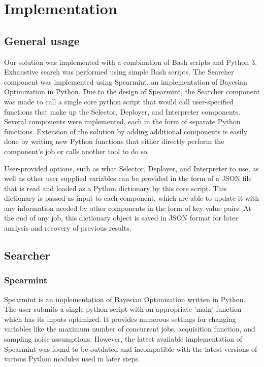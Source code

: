 \documentclass{report}
\begin{document}
\chapter{Implementation}
\section{General usage}
Our solution was implemented with a combination of Bash scripts and Python 3. Exhaustive search was performed using simple Bash scripts. The Searcher component was implemented using Spearmint\cite{Snoek2012}, an implementation of Bayesian Optimization in Python. Due to the design of Spearmint, the Searcher component was made to call a single core python script that would call user-specified functions that make up the Selector, Deployer, and Interpreter components. Several components were implemented, each in the form of separate Python functions. Extension of the solution by adding additional components is easily done by writing new Python functions that either directly perform the component's job or calls another tool to do so.

User-provided options, such as what Selector, Deployer, and Interpreter to use, as well as other user supplied variables can be provided in the form of a JSON file that is read and loaded as a Python dictionary by this core script. This dictionary is passed as input to each component, which are able to update it with any information needed by other components in the form of key-value pairs. At the end of any job, this dictionary object is saved in JSON format for later analysis and recovery of previous results.

\section{Searcher}
\subsection{Spearmint}
Spearmint is an implementation of Bayesian Optimization written in Python. The user submits a single python script with an appropriate 'main' function which has its inputs optimized. It provides numerous settings for changing variables like the maximum number of concurrent jobs, acquisition function, and sampling noise assumptions. However, the latest available implementation of Spearmint was found to be outdated and incompatible with the latest versions of various Python modules used in later steps. 
\end{document}
